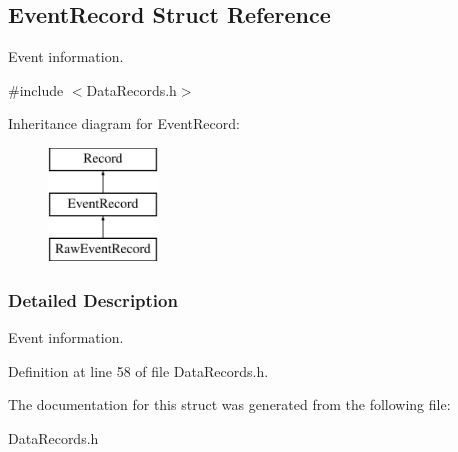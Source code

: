 \hypertarget{structEventRecord}{
\subsection{EventRecord Struct Reference}
\label{structEventRecord}
}


Event information.  




{\ttfamily \#include $<$DataRecords.h$>$}

Inheritance diagram for EventRecord:\begin{figure}[H]
\begin{center}
\leavevmode
\includegraphics[height=3.000000cm]{structEventRecord}
\end{center}
\end{figure}


\subsubsection{Detailed Description}
Event information. 

Definition at line 58 of file DataRecords.h.



The documentation for this struct was generated from the following file:\begin{DoxyCompactItemize}
\item 
DataRecords.h\end{DoxyCompactItemize}
